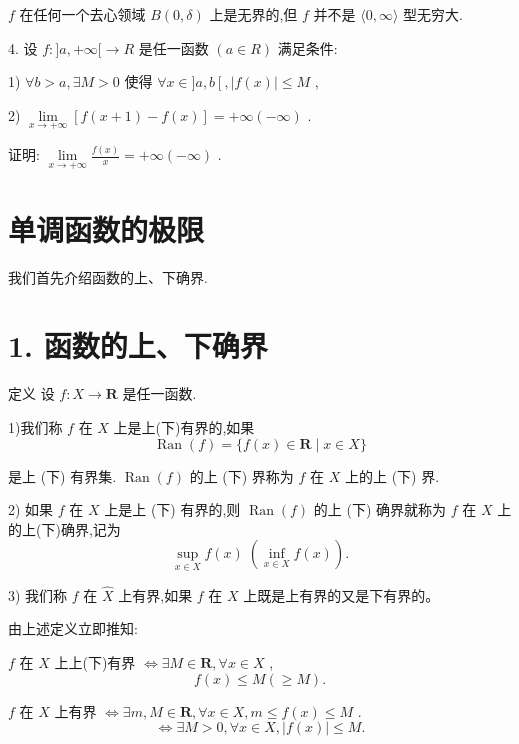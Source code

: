 $f$ 在任何一个去心领域 $B\left( {0,\delta }\right)$ 上是无界的,但 $f$ 并不是 $\langle 0,\infty \rangle$ 型无穷大.

4. 设 $f : \rbrack a, + \infty \lbrack  \rightarrow  R$ 是任一函数 $\left( {a \in  R}\right)$ 满足条件:

1) $\forall b > a,\exists M > 0$ 使得 $\forall x \in  \rbrack a,b\left\lbrack  {,\left| {f\left( x\right) }\right|  \leq  M}\right.$ ,

2) $\mathop{\lim }\limits_{{x \rightarrow   + \infty }}\left\lbrack  {f\left( {x + 1}\right)  - f\left( x\right) }\right\rbrack   =  + \infty \left( {-\infty }\right)$ .

证明: $\mathop{\lim }\limits_{{x \rightarrow   + \infty }}\frac{f\left( x\right) }{x} =  + \infty \left( {-\infty }\right)$ .

\section{单调函数的极限}

我们首先介绍函数的上、下确界.

\section*{1. 函数的上、下确界}

定义 设 $f : X \rightarrow  \mathbf{R}$ 是任一函数.

1)我们称 $f$ 在 $X$ 上是上(下)有界的,如果
$$\operatorname{Ran}\left( f\right)  = \{ f\left( x\right)  \in  \mathbf{R} \mid  x \in  X\}$$

是上 (下) 有界集. $\operatorname{Ran}\left( f\right)$ 的上 (下) 界称为 $f$ 在 $X$ 上的上 (下) 界.

2) 如果 $f$ 在 $X$ 上是上 (下) 有界的,则 $\operatorname{Ran}\left( f\right)$ 的上 (下) 确界就称为 $f$ 在 $X$ 上的上(下)确界,记为
$$\mathop{\sup }\limits_{{x \in  X}}f\left( x\right) \;\left( {\mathop{\inf }\limits_{{x \in  X}}f\left( x\right) }\right) .$$

3) 我们称 $f$ 在 $\widehat{X}$ 上有界,如果 $f$ 在 $X$ 上既是上有界的又是下有界的。

由上述定义立即推知:

$f$ 在 $X$ 上上(下)有界 $\Leftrightarrow  \exists M \in  \mathbf{R},\forall x \in  X$ ,
$$f\left( x\right)  \leq  M\left( { \geq  M}\right) .$$

$f$ 在 $X$ 上有界 $\Leftrightarrow  \exists m,M \in  \mathbf{R},\forall x \in  X,m \leq  f\left( x\right)  \leq  M$ .
$$\Leftrightarrow  \exists M > 0,\forall x \in  X,\left| {f\left( x\right) }\right|  \leq  M.$$

